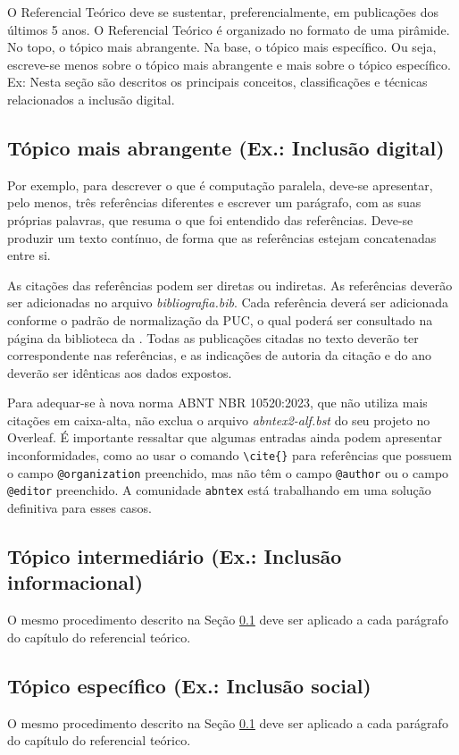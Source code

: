 O Referencial Teórico deve se sustentar, preferencialmente, em publicações dos últimos 5 anos. O Referencial Teórico é organizado no formato de uma pirâmide. No topo, o tópico mais abrangente. Na base, o tópico mais específico. Ou seja, escreve-se menos sobre o tópico mais abrangente e mais sobre o tópico específico. Ex: Nesta seção são descritos os principais conceitos, classificações e técnicas relacionados a inclusão digital. 

\subsection{\esp Tópico mais abrangente (Ex.: Inclusão digital)} 
\label{subsec:1}
Por exemplo, para descrever o que é computação paralela, deve-se apresentar, pelo menos, três referências diferentes e escrever um parágrafo, com as suas próprias palavras, que resuma o que foi entendido das referências. Deve-se produzir um texto contínuo, de forma que as referências estejam concatenadas entre si.

As citações das referências podem ser diretas ou indiretas. As referências deverão ser adicionadas no arquivo \textit{bibliografia.bib}. Cada referência deverá ser adicionada conforme o padrão de normalização da PUC, 
o qual poderá ser consultado na página da biblioteca da . Todas as publicações citadas no texto deverão ter correspondente nas referências, 
e as indicações de autoria da citação e do ano deverão ser idênticas aos dados expostos. 

Para adequar-se à nova norma ABNT NBR 10520:2023, que não utiliza mais citações em caixa-alta, não exclua o arquivo \textit{abntex2-alf.bst} do seu projeto no Overleaf. É importante ressaltar que algumas entradas ainda podem apresentar inconformidades, como ao usar o comando \verb|\cite{}| para referências que possuem o campo \verb|@organization| preenchido, mas não têm o campo \verb|@author| ou o campo \verb|@editor| preenchido. A comunidade \texttt{abntex} está trabalhando em uma solução definitiva para esses casos.

\subsection{\esp Tópico intermediário (Ex.: Inclusão informacional) }
O mesmo procedimento descrito na Seção \ref{subsec:1} deve ser aplicado a cada parágrafo do capítulo do referencial teórico.

\subsection{\esp Tópico específico (Ex.: Inclusão social) }
O mesmo procedimento descrito na Seção \ref{subsec:1} deve ser aplicado a cada parágrafo do capítulo do referencial teórico.




